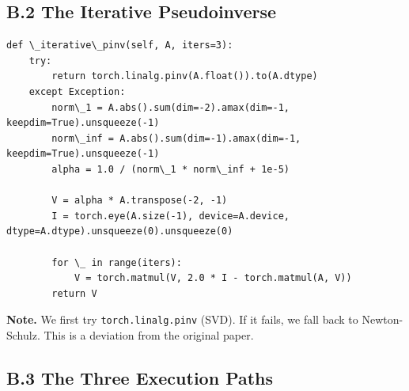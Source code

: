 \subsection{B.2 The Iterative Pseudoinverse}

\begin{lstlisting}
def \_iterative\_pinv(self, A, iters=3):
    try:
        return torch.linalg.pinv(A.float()).to(A.dtype)
    except Exception:
        norm\_1 = A.abs().sum(dim=-2).amax(dim=-1, keepdim=True).unsqueeze(-1)
        norm\_inf = A.abs().sum(dim=-1).amax(dim=-1, keepdim=True).unsqueeze(-1)
        alpha = 1.0 / (norm\_1 * norm\_inf + 1e-5)
        
        V = alpha * A.transpose(-2, -1)
        I = torch.eye(A.size(-1), device=A.device, dtype=A.dtype).unsqueeze(0).unsqueeze(0)
        
        for \_ in range(iters):
            V = torch.matmul(V, 2.0 * I - torch.matmul(A, V))
        return V
\end{lstlisting}

\textbf{Note.} We first try \texttt{torch.linalg.pinv} (SVD). If it fails, we fall back 
to Newton-Schulz. This is a deviation from the original paper.

\subsection{B.3 The Three Execution Paths}

